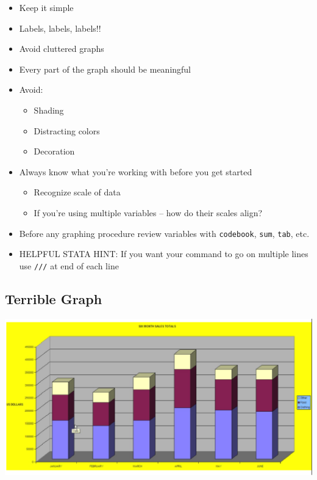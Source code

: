 \documentclass[]{book}
\providecommand{\tightlist}{%
  \setlength{\itemsep}{0pt}\setlength{\parskip}{0pt}}
\begin{document}
\begin{itemize}
\tightlist
\item
  Keep it simple
\item
  Labels, labels, labels!!
\item
  Avoid cluttered graphs
\item
  Every part of the graph should be meaningful
\item
  Avoid:

  \begin{itemize}
  \tightlist
  \item
    Shading
  \item
    Distracting colors
  \item
    Decoration
  \end{itemize}
\item
  Always know what you're working with before you get started

  \begin{itemize}
  \tightlist
  \item
    Recognize scale of data
  \item
    If you're using multiple variables -- how do their scales align?
  \end{itemize}
\item
  Before any graphing procedure review variables with \texttt{codebook}, \texttt{sum}, \texttt{tab}, etc.
\item
  HELPFUL STATA HINT: If you want your command to go on multiple lines use \texttt{///} at end of each line
\end{itemize}

\hypertarget{terrible-graph}{%
\subsection{Terrible Graph}\label{terrible-graph}}

\includegraphics{Stata/StataModGraph/images/Terrible.png}
\end{document}
